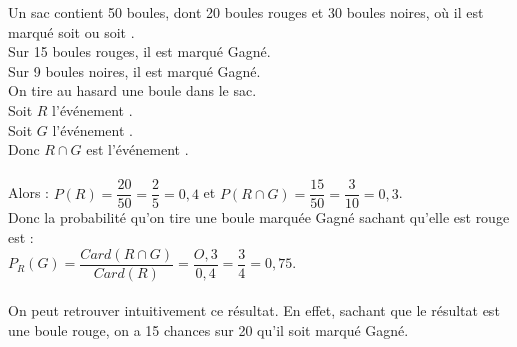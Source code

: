 \begin{bexemples}
    
%        
        Un sac contient 50 boules, dont 20 boules rouges et 30 boules noires, où il est marqué soit  ou soit .\\ 
        Sur 15 boules rouges, il est marqué Gagné.\\
        Sur 9 boules noires, il est marqué Gagné.\\
        On tire au hasard une boule dans le sac.\\
        Soit $R$ l'événement .\\
        Soit $G$ l'événement .\\
        Donc $R \cap G$ est l'événement .\\
        \ \\
        Alors : $P(R)= \dfrac{20}{50} = \dfrac{2}{5}=0,4$ et $P(R \cap G)= \dfrac{15}{50}=\dfrac{3}{10}=0,3$.\\
        Donc la probabilité qu'on tire une boule marquée Gagné sachant qu'elle est rouge est :\\
        $P_R(G)= \dfrac{Card(R \cap G)}{Card(R)}=\dfrac{O,3}{0,4}=\dfrac{3}{4}=0,75$.\\
        \ \\
        On peut retrouver intuitivement ce résultat. En effet, sachant que le résultat est une boule rouge, on a 15 chances sur 20 qu'il soit marqué Gagné.
\end{bexemples}

